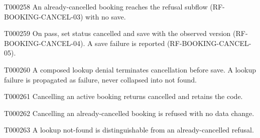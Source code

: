 \documentclass[11pt,a4paper]{article}
\begin{document}
\begin{atlasparagraph}{T000258}
An already-cancelled booking reaches the refusal subflow (RF-BOOKING-CANCEL-03) with no save.
\end{atlasparagraph}
\begin{atlasparagraph}{T000259}
On pass, set status cancelled and save with the observed version (RF-BOOKING-CANCEL-04). A save failure is reported (RF-BOOKING-CANCEL-05).
\end{atlasparagraph}
\begin{atlasparagraph}{T000260}
A composed lookup denial terminates cancellation before save. A lookup failure is propagated as failure, never collapsed into not found.
\end{atlasparagraph}
\par{}
\par{}\hypertarget{AC-BOOKING-CANCEL-01}{}
\begin{atlasparagraph}{T000261}
Cancelling an active booking returns cancelled and retains the code.
\end{atlasparagraph}
\par{}\hypertarget{AC-BOOKING-CANCEL-02}{}
\begin{atlasparagraph}{T000262}
Cancelling an already-cancelled booking is refused with no data change.
\end{atlasparagraph}
\par{}\hypertarget{AC-BOOKING-CANCEL-03}{}
\begin{atlasparagraph}{T000263}
A lookup not-found is distinguishable from an already-cancelled refusal.
\end{atlasparagraph}
\par{}\hypertarget{AC-BOOKING-CANCEL-FAILURE}{}
\end{document}
